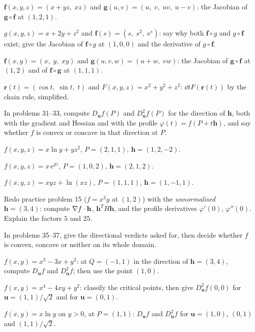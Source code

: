 \begin{problems}[resume]
  \item $\mathbf{f}(x,y,z)=(x+yz,\;xz)$ and
        $\mathbf{g}(u,v)=(u,\;v,\;uv,\;u-v)$: the Jacobian of
        $\mathbf{g}\circ\mathbf{f}$ at $(1,2,1)$.
  \item $g(x,y,z)=x+2y+z^{2}$ and $\mathbf{f}(s)=(s,\;s^{2},\;\mathrm{e}^{s})$:
        say why both $\mathbf{f}\circ g$ and $g\circ\mathbf{f}$ exist; give
        the Jacobian of $\mathbf{f}\circ g$ at $(1,0,0)$ and the derivative
        of $g\circ\mathbf{f}$.
  \item $\mathbf{f}(x,y)=(x,\;y,\;xy)$ and $\mathbf{g}(u,v,w)=(u+w,\;vw)$:
        the Jacobian of $\mathbf{g}\circ\mathbf{f}$ at $(1,2)$ and of
        $\mathbf{f}\circ\mathbf{g}$ at $(1,1,1)$.
  \item $\mathbf{r}(t)=(\cos t,\;\sin t,\;t)$ and $F(x,y,z)=x^{2}+y^{2}+z^{2}$:
        $\dd{}{t}F(\mathbf{r}(t))$ by the chain rule, simplified.
\end{problems}

In problems 31--33, compute $D_{\mathbf{u}}f(P)$ and $D^{2}_{\mathbf{u}}f(P)$
for the direction of $\mathbf{h}$, both with the gradient and Hessian and
with the profile $\varphi(t)=f(P+t\mathbf{h})$, and say whether $f$ is
convex or concave in that direction at $P$.

\begin{problems}[resume]
  \item $f(x,y,z)=x\ln y+yz^{2}$, \;$P=(2,1,1)$, \;$\mathbf{h}=(1,2,-2)$.
  \item $f(x,y,z)=x\,\mathrm{e}^{yz}$, \;$P=(1,0,2)$, \;$\mathbf{h}=(2,1,2)$.
  \item $f(x,y,z)=xyz+\ln(xz)$, \;$P=(1,1,1)$, \;$\mathbf{h}=(1,-1,1)$.
  \item Redo practice problem 15 ($f=x^{2}y$ at $(1,2)$) with the
        \emph{unnormalised} $\mathbf{h}=(3,4)$: compute
        $\nabla f\cdot\mathbf{h}$, $\mathbf{h}^{T}H\mathbf{h}$, and the
        profile derivatives $\varphi'(0)$, $\varphi''(0)$. Explain the
        factors $5$ and $25$.
\end{problems}

In problems 35--37, give the directional verdicts asked for, then decide
whether $f$ is convex, concave or neither on its whole domain.

\begin{problems}[resume]
  \item $f(x,y)=x^{3}-3x+y^{2}$: at $Q=(-1,1)$ in the direction of
        $\mathbf{h}=(3,4)$, compute $D_{\mathbf{u}}f$ and
        $D^{2}_{\mathbf{u}}f$; then use the point $(1,0)$.
  \item $f(x,y)=x^{4}-4xy+y^{2}$: classify the critical points, then give
        $D^{2}_{\mathbf{u}}f(0,0)$ for $\mathbf{u}=(1,1)/\sqrt2$ and for
        $\mathbf{u}=(0,1)$.
  \item $f(x,y)=x\ln y$ on $y>0$, at $P=(1,1)$: $D_{\mathbf{u}}f$ and
        $D^{2}_{\mathbf{u}}f$ for $\mathbf{u}=(1,0)$, $(0,1)$ and
        $(1,1)/\sqrt2$.
\end{problems}

